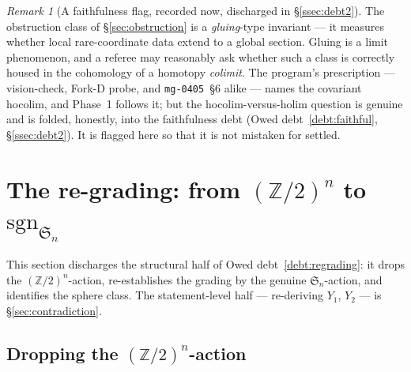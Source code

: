 \documentclass[11pt,oneside]{amsart}
\theoremstyle{plain}
\theoremstyle{definition}
\theoremstyle{remark}
\newtheorem{remark}[theorem]{Remark}
\theoremstyle{honeststyle}
\newcommand{\sgn}{\mathrm{sgn}}
\newcommand{\Sym}{\mathfrak{S}}
\newcommand{\Z}{\mathbb{Z}}
\begin{document}
\begin{remark}[A faithfulness flag, recorded now, discharged in \S\ref{ssec:debt2}]
\label{rem:hocolim-flag}
The obstruction class of \S\ref{sec:obstruction} is a
\emph{gluing}-type invariant --- it measures whether local
rare-coordinate data extend to a global section. Gluing is a limit
phenomenon, and a referee may reasonably ask whether such a class is
correctly housed in the cohomology of a homotopy \emph{colimit}. The
program's prescription --- vision-check, Fork-D probe, and
\texttt{mg-0405}~\S6 alike --- names the covariant hocolim, and Phase~1
follows it; but the hocolim-versus-holim question is genuine and is
folded, honestly, into the faithfulness debt (Owed
debt~\ref{debt:faithful}, \S\ref{ssec:debt2}). It is flagged here so
that it is not mistaken for settled.
\end{remark}

\section{The re-grading: from $(\Z/2)^n$ to $\sgn_{\Sym_n}$}
\label{sec:regrading}

This section discharges the structural half of Owed
debt~\ref{debt:regrading}: it drops the $(\Z/2)^n$-action,
re-establishes the grading by the genuine $\Sym_n$-action, and
identifies the sphere class. The statement-level half --- re-deriving
$Y_1$, $Y_2$ --- is \S\ref{sec:contradiction}.

\subsection{Dropping the $(\Z/2)^n$-action}
\label{ssec:drop-z2}
\end{document}
